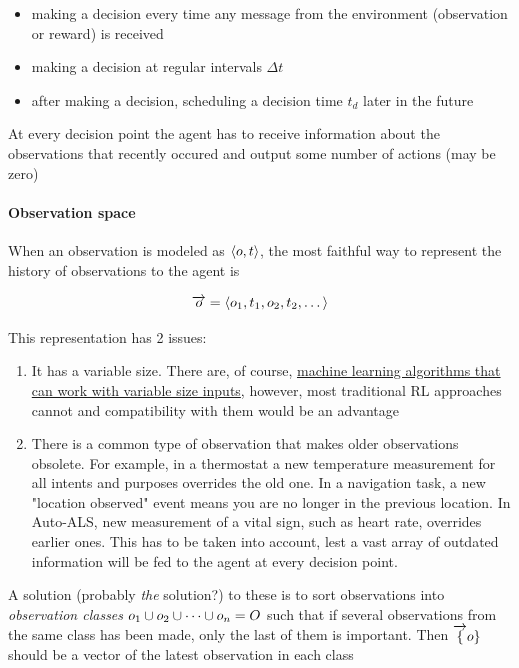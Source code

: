 \begin{itemize}
\item
  making a decision every time any message from the environment
  (observation or reward) is received
\item
  making a decision at regular intervals
  $\Delta t$
\item
  after making a decision, scheduling a decision time
  $t_d$ later in the future
\end{itemize}

At every decision point the agent has to receive information about the
observations that recently occured and output some number of actions
(may be zero)

\paragraph{Observation space}

When an observation is modeled as $\langle o, t \rangle$, the most faithful way to represent the history of observations to the agent is

\begin{equation} 
\overrightarrow{o} = \langle o_1, t_1, o_2, t_2, \dots \rangle 
\end{equation}

This representation has 2 issues: 
\begin{enumerate}
    \item It has a variable size. There are, of course, \href{https://www.bioinf.jku.at/publications/older/2604.pdf}{machine
learning algorithms that can work with variable size inputs}, however,
most traditional RL approaches cannot and compatibility with them would
be an advantage
    \item There is a common type of observation that makes older
observations obsolete. For example, in a thermostat a new temperature measurement for all intents and purposes overrides the old one. In a navigation task, a new "location observed" event means you are no longer in the previous location. In Auto-ALS, new measurement of a vital sign, such as heart rate, overrides earlier ones. This has to be taken into account, lest a vast array of outdated information will be fed to the agent at every decision point.
\end{enumerate}

A solution (probably \emph{the} solution?) to these is to sort observations into \emph{observation classes} $o_1 \cup o_2 \cup \dots
\cup o_n = O$ such that if several observations from the same class has been made, only the last of them is important. Then $\overrightarrow\{o\}$ should
be a vector of the latest observation in each class

